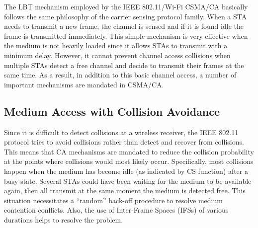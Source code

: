 The LBT mechanism employed by the IEEE 802.11/Wi-Fi CSMA/CA basically follows the same philosophy of the carrier sensing protocol family. When a STA needs to transmit a new frame, the channel is sensed and if it is found idle the frame is transmitted immediately. This simple mechanism is very effective when the medium is not heavily loaded since it allows STAs to transmit with a minimum delay. However, it cannot prevent channel access collisions when multiple STAs detect a free channel and decide to transmit their frames at the same time. As a result, in addition to this basic channel access, a number of important mechanisms are mandated in CSMA/CA.


\subsection{Medium Access with Collision Avoidance}
\label{collision-avoidance}

Since it is difficult to detect collisions at a wireless receiver, the IEEE 802.11 protocol tries to avoid collisions rather than detect and recover from collisions. This means that CA mechanisms are mandated to reduce the collision probability at the points where collisions would most likely occur. Specifically, most collisions happen when the medium has become idle (as indicated by CS function) after a busy state. Several STAs could have been waiting for the medium to be available again, then all transmit at the same moment the medium is detected free. This situation necessitates a ``random'' back-off procedure to resolve medium contention conflicts. Also, the use of Inter-Frame Spaces (IFSs) of various durations helps to resolve the problem. 

